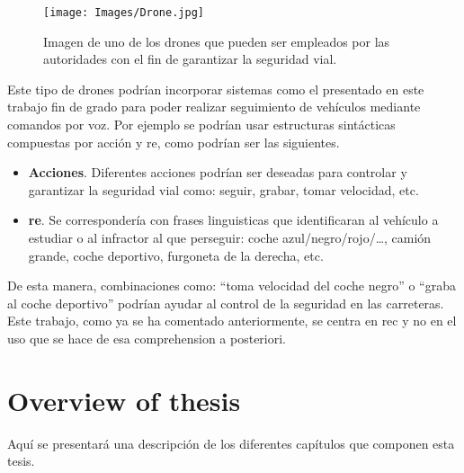 \begin{figure}[ht]
  \centering
  \texttt{[image: Images/Drone.jpg]}
  \caption[Drones empleados para la seguridad vial]{Imagen de uno de los drones
    que pueden ser empleados por las autoridades con el fin de garantizar la
    seguridad vial.}
  \label{fig:dgt}
\end{figure}

Este tipo de drones podrían incorporar sistemas como el presentado en este
trabajo fin de grado para poder realizar seguimiento de vehículos mediante
comandos por voz. Por ejemplo se podrían usar estructuras sintácticas
compuestas por acción y \gls{re}, como podrían ser las siguientes.

\begin{itemize}
  \item \textbf{Acciones}. Diferentes acciones podrían ser deseadas para
  controlar y garantizar la seguridad vial como: seguir, grabar, tomar
  velocidad, etc.
  \item \textbf{\gls*{re}}. Se correspondería con frases linguisticas que
  identificaran al vehículo a estudiar o al infractor al que perseguir: coche
  azul/negro/rojo/\ldots, camión grande, coche deportivo, furgoneta de la
  derecha, etc.
\end{itemize}

De esta manera, combinaciones como: ``toma velocidad del coche negro'' o
``graba al coche deportivo'' podrían ayudar al control de la seguridad en las
carreteras. Este trabajo, como ya se ha comentado anteriormente, se centra en
\gls{rec} y no en el uso que se hace de esa comprehension a posteriori.


\section{Overview of thesis}

Aquí se presentará una descripción de los diferentes capítulos que componen
esta tesis.

